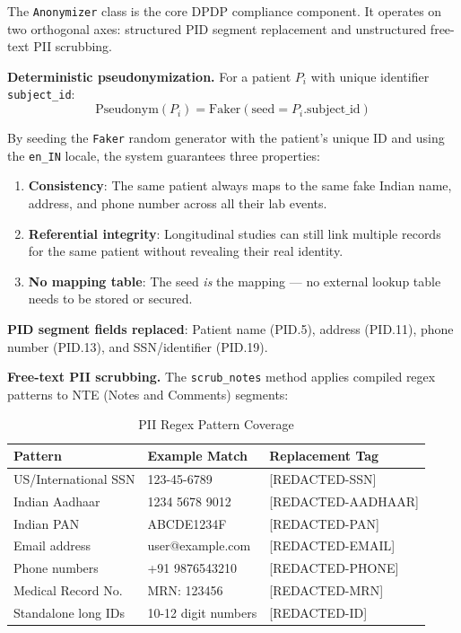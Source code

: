 \documentclass[12pt,a4paper]{report}
\begin{document}
The \texttt{Anonymizer} class is the core DPDP compliance component. It operates on
two orthogonal axes: structured PID segment replacement and unstructured free-text
PII scrubbing.

\textbf{Deterministic pseudonymization.} For a patient $P_i$ with unique identifier
\texttt{subject\_id}:
\begin{equation}
    \text{Pseudonym}(P_i) = \text{Faker}(\text{seed} = P_i.\text{subject\_id})
\end{equation}

By seeding the \texttt{Faker} random generator with the patient's unique ID and using
the \texttt{en\_IN} locale, the system guarantees three properties:
\begin{enumerate}
    \item \textbf{Consistency}: The same patient always maps to the same fake Indian
    name, address, and phone number across all their lab events.
    \item \textbf{Referential integrity}: Longitudinal studies can still link multiple
    records for the same patient without revealing their real identity.
    \item \textbf{No mapping table}: The seed \emph{is} the mapping --- no external
    lookup table needs to be stored or secured.
\end{enumerate}

\textbf{PID segment fields replaced}: Patient name (PID.5), address (PID.11), phone
number (PID.13), and SSN/identifier (PID.19).

\textbf{Free-text PII scrubbing.} The \texttt{scrub\_notes} method applies compiled
regex patterns to NTE (Notes and Comments) segments:

\begin{table}[H]
\centering
\caption{PII Regex Pattern Coverage}
\begin{tabular}{p{4cm} p{4cm} p{4cm}}
\toprule
Pattern & Example Match & Replacement Tag \\
\midrule
US/International SSN & 123-45-6789 & {[REDACTED-SSN]} \\[0.3em]
Indian Aadhaar & 1234 5678 9012 & {[REDACTED-AADHAAR]} \\[0.3em]
Indian PAN & ABCDE1234F & {[REDACTED-PAN]} \\[0.3em]
Email address & user@example.com & {[REDACTED-EMAIL]} \\[0.3em]
Phone numbers & +91 9876543210 & {[REDACTED-PHONE]} \\[0.3em]
Medical Record No. & MRN: 123456 & {[REDACTED-MRN]} \\[0.3em]
Standalone long IDs & 10-12 digit numbers & {[REDACTED-ID]} \\
\bottomrule
\end{tabular}
\end{table}
\end{document}
